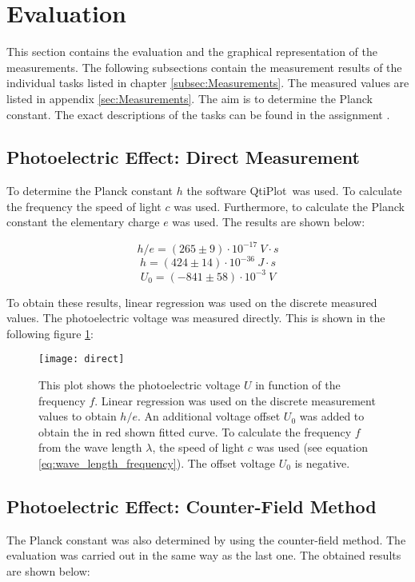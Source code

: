 \section{Evaluation}
\label{sec:Evaluation}
This section contains the evaluation and the graphical representation of the measurements. The following subsections contain the measurement results of the individual tasks listed in chapter \ref{subsec:Measurements}. The measured values are listed in appendix \ref{sec:Measurements}. The aim is to determine the Planck constant. The exact descriptions of the tasks can be found in the assignment \cite{light_quantum}.

\subsection{Photoelectric Effect: Direct Measurement}
\label{subsec:Direct_Measurement}
To determine the Planck constant $h$ the software \flqq QtiPlot\frqq\ was used. To calculate the frequency the speed of light $c$ was used. Furthermore, to calculate the Planck constant the elementary charge $e$ was used. The results are shown below:

\[
h/e = (265\pm 9)\cdot 10^{-17}\ \si{V}\cdot\si{s}
\]
\[
h = (424\pm 14)\cdot 10^{-36}\ \si{J}\cdot\si{s}
\]
\[
U_0 = (-841\pm 58)\cdot 10^{-3}\ \si{V}
\]

To obtain these results, linear regression was used on the discrete measured values. The photoelectric voltage was measured directly. This is shown in the following figure \ref{fig:direct}:

\begin{figure}[H]
	\centering
	\texttt{[image: direct]}
	\caption{This plot shows the photoelectric voltage $U$ in function of the frequency $f$. Linear regression was used on the discrete measurement values to obtain $h/e$. An additional voltage offset $U_0$ was added to obtain the in red shown fitted curve. To calculate the frequency $f$ from the wave length $\lambda$, the speed of light $c$ was used (see equation \ref{eq:wave_length_frequency}). The offset voltage $U_0$ is negative.}
	\label{fig:direct}
\end{figure}

\newpage
\subsection{Photoelectric Effect: Counter-Field Method}
\label{subsec:Counter-Field_Method}
The Planck constant was also determined by using the counter-field method. The evaluation was carried out in the same way as the last one. The obtained results are shown below:

